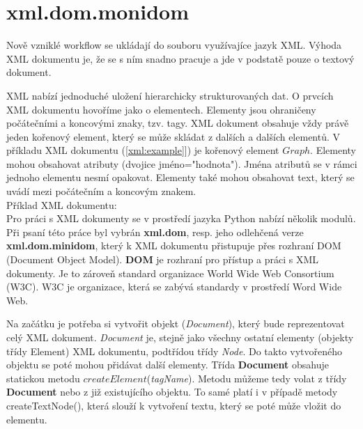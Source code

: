 \newpage

\section{xml.dom.monidom}
\nocite{python:www}
\nocite{py3:book}

Nově vzniklé workflow se ukládají do souboru využívajíce
jazyk  XML. Výhoda XML dokumentu je, že se s ním snadno
pracuje a jde v podstatě pouze o textový dokument.

XML nabízí jednoduché uložení hierarchicky strukturovaných dat. O
prvcích XML dokumentu hovoříme jako o elementech. Elementy jsou
ohraničeny počátečními a koncovými znaky, tzv. tagy. XML dokument
obsahuje vždy právě jeden kořenový element, který se může skládat z
dalších a dalších elementů. V příkladu XML dokumentu
(\autoref{xml:example}]) je kořenový element $Graph$. Elementy mohou
obsahovat atributy (dvojice jméno="hodnota").  Jména atributů se v
rámci jednoho elementu nesmí opakovat. Elementy také mohou obsahovat
text, který se uvádí mezi počátečním a koncovým znakem. \\

\noindent Příklad XML dokumentu$:$ \\



Pro práci s XML dokumenty se v prostředí jazyka Python nabízí několik
modulů. Při psaní této práce byl
vybrán  \textbf{xml.dom}, resp. jeho odlehčená
verze  \textbf{xml.dom.minidom}, který k XML
dokumentu přistupuje přes rozhraní DOM (Document Object
Model).  \textbf{DOM} je rozhraní pro přístup a práci s XML
dokumenty. Je to zároveň standard organizace World Wide Web Consortium
(W3C). W3C je organizace, která se zabývá standardy v prostředí Word
Wide Web.

Na začátku je potřeba si vytvořit objekt (\textit{Document}), který
bude reprezentovat celý XML dokument. \textit{Document} je, stejně
jako všechny ostatní elementy (objekty třídy Element) XML dokumentu,
podtřídou třídy \textit{Node}. Do takto vytvořeného objektu se poté
mohou přidávat další elementy. Třída \textbf{Document} obsahuje
statickou metodu $createElement$(\textit{tagName}). Metodu můžeme tedy
volat z třídy \textbf{Document} nebo z již existujícího objektu. To
samé platí i v případě metody createTextNode(), která slouží k
vytvoření textu, který se poté může vložit do elementu.

